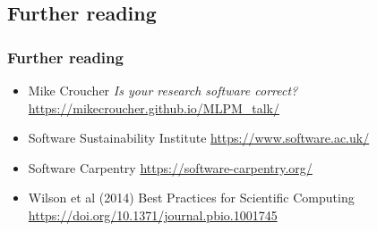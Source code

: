 \subsection{Further reading}

\begin{frame}
  \frametitle{Further reading}
  \begin{itemize}

    \item Mike Croucher \emph{Is your research software correct?}
    \url{https://mikecroucher.github.io/MLPM_talk/}

    \item Software Sustainability Institute
    \url{https://www.software.ac.uk/}

    \item Software Carpentry
    \url{https://software-carpentry.org/}

    \item Wilson et al (2014) Best Practices for Scientific Computing
    \url{https://doi.org/10.1371/journal.pbio.1001745}

  \end{itemize}
\end{frame}



